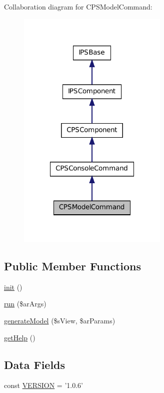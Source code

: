 Collaboration diagram for CPSModelCommand:\nopagebreak
\begin{figure}[H]
\begin{center}
\leavevmode
\includegraphics[width=204pt]{classCPSModelCommand__coll__graph}
\end{center}
\end{figure}
\subsection*{Public Member Functions}
\begin{DoxyCompactItemize}
\item 
\hyperlink{classCPSModelCommand_a4be4055f3361d4800e16bc2e2e38cda6}{init} ()
\item 
\hyperlink{classCPSModelCommand_a330e31e8c3572ce01a4e1c8485c6aedd}{run} (\$arArgs)
\item 
\hyperlink{classCPSModelCommand_afae31a43a5d0c7b44333eba3cc20f70e}{generateModel} (\$sView, \$arParams)
\item 
\hyperlink{classCPSModelCommand_a4cc928ef4def3a84c181608d31bf7608}{getHelp} ()
\end{DoxyCompactItemize}
\subsection*{Data Fields}
\begin{DoxyCompactItemize}
\item 
const \hyperlink{classCPSModelCommand_af71005841ce53adac00581ab0ba24c1f}{VERSION} = '1.0.6'
\end{DoxyCompactItemize}
